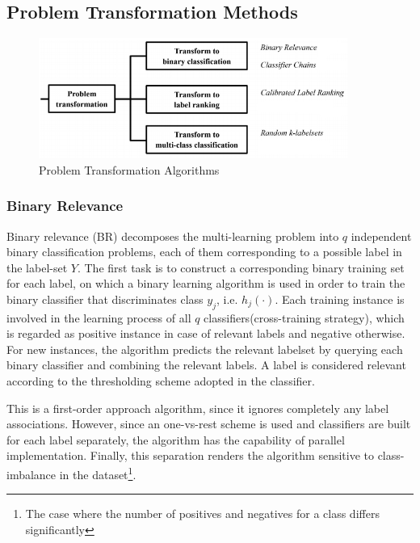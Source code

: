 \documentclass[12pt]{report}
\begin{document}
	\subsection*{Problem Transformation Methods}
	\begin{figure}[H]
		\centering
		\includegraphics[width=0.9\textwidth]{pt.png}
		\caption{Problem Transformation Algorithms}
		\centering
	\end{figure}

	\subsubsection*{Binary Relevance}
	Binary relevance (BR) decomposes the multi-learning problem into $q$
  independent binary classification problems, each of them corresponding to a
  possible label in the label-set $Y$. The first task is to construct a
  corresponding binary training set for each label, on which a binary learning
  algorithm is used in order to train the binary classifier that discriminates
  class $y_j$, i.e. $h_j(\cdot)$. Each training instance is involved in the
  learning process of all $q$ classifiers(cross-training strategy), which is
  regarded as positive instance in case of relevant labels and negative
  otherwise. For new instances, the algorithm predicts the relevant labelset by
  querying each binary classifier and combining the relevant labels. A label is
  considered relevant according to the thresholding scheme adopted in the classifier.
	
	This is a first-order approach algorithm, since it ignores completely any
  label associations. However, since an one-vs-rest scheme is used and
  classifiers are built for each label separately, the algorithm has the
  capability of parallel implementation. Finally, this separation renders the
  algorithm sensitive to class-imbalance in the dataset\footnote{The case where
    the number of positives and negatives for a class differs significantly}.
	
\end{document}
